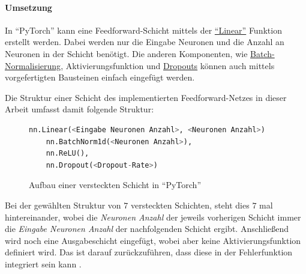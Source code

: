 


\paragraph{Umsetzung}
In \enquote{PyTorch} kann eine Feedforward-Schicht mittels der \href{https://pytorch.org/docs/stable/generated/torch.nn.Linear.html}{\enquote{Linear}} Funktion erstellt werden. Dabei werden nur die Eingabe Neuronen und die Anzahl an Neuronen in der Schicht benötigt. Die anderen Komponenten, wie 
\href{https://pytorch.org/docs/stable/generated/torch.nn.BatchNorm1d.html}{Batch-Normalisierung}, 
Aktivierungsfunktion und 
\href{https://pytorch.org/docs/stable/generated/torch.nn.Dropout.html}{Dropouts}
können auch mittels vorgefertigten Bausteinen einfach eingefügt werden. 

Die Struktur einer Schicht des implementierten Feedforward-Netzes in dieser Arbeit umfasst damit folgende Struktur:
\begin{figure}[H]
    \centering
    \begin{lstlisting}[language=python]
    nn.Linear(<Eingabe Neuronen Anzahl>, <Neuronen Anzahl>)
    nn.BatchNorm1d(<Neuronen Anzahl>),
    nn.ReLU(),
    nn.Dropout(<Dropout-Rate>)
    \end{lstlisting}
    \caption{Aufbau einer versteckten Schicht in \enquote{PyTorch}}
    \label{fig:hidden_layer_struct}
\end{figure}


Bei der gewählten Struktur von $7$ versteckten Schichten, steht dies $7$ mal hintereinander, wobei die \textit{Neuronen Anzahl} der jeweils vorherigen Schicht immer die \textit{Eingabe Neuronen Anzahl} der nachfolgenden Schicht ergibt.
Anschließend wird noch eine Ausgabeschicht eingefügt, wobei aber keine Aktivierungsfunktion definiert wird. Das ist darauf zurückzuführen, dass diese in der Fehlerfunktion integriert sein kann \cite{Goodfellow2016}.

